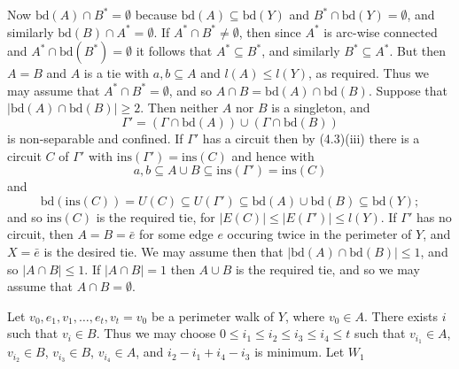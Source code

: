 Now $\text{bd}(A) \cap B^* = \emptyset$ because $\text{bd}(A) \subseteq \text{bd}(Y)$ and $B^* \cap \text{bd}(Y) = \emptyset$, and similarly $\text{bd}(B) \cap A^* = \emptyset$. If $A^* \cap B^* \ne \emptyset$, then since $A^*$ is arc-wise connected and $A^* \cap \text{bd}(B^*) = \emptyset$ it follows that $A^* \subseteq B^*$, and similarly $B^* \subseteq A^*$. But then $A = B$ and $A$ is a tie with $a, b \subseteq A$ and $l(A) \le l(Y)$, as required. Thus we may assume that $A^* \cap B^* = \emptyset$, and so $A \cap B = \text{bd}(A) \cap \text{bd}(B)$. Suppose that $|\text{bd}(A) \cap \text{bd}(B)| \ge 2$. Then neither $A$ nor $B$ is a singleton, and
\begin{equation*}
\Gamma' = (\Gamma \cap \text{bd}(A)) \cup (\Gamma \cap \text{bd}(B))
\end{equation*}
is non-separable and confined. If $\Gamma'$ has a circuit then by (4.3)(iii) there is a circuit $C$ of $\Gamma'$ with $\text{ins}(\Gamma') = \text{ins}(C)$ and hence with
\begin{equation*}
a, b \subseteq A \cup B \subseteq \text{ins}(\Gamma') = \text{ins}(C)
\end{equation*}
and
\begin{equation*}
\text{bd}(\text{ins}(C)) = U(C) \subseteq U(\Gamma') \subseteq \text{bd}(A) \cup \text{bd}(B) \subseteq \text{bd}(Y);
\end{equation*}
and so $\text{ins}(C)$ is the required tie, for $|E(C)| \le |E(\Gamma')| \le l(Y)$. If $\Gamma'$ has no circuit, then $A = B = \bar{e}$ for some edge $e$ occuring twice in the perimeter of $Y$, and $X = \bar{e}$ is the desired tie. We may assume then that $|\text{bd}(A) \cap \text{bd}(B)| \le 1$, and so $|A \cap B| \le 1$. If $|A \cap B| = 1$ then $A \cup B$ is the required tie, and so we may assume that $A \cap B = \emptyset$.

Let $v_0, e_1, v_1, \dots, e_t, v_t = v_0$ be a perimeter walk of $Y$, where $v_0 \in A$. There exists $i$ such that $v_i \in B$. Thus we may choose $0 \le i_1 \le i_2 \le i_3 \le i_4 \le t$ such that $v_{i_1} \in A$, $v_{i_2} \in B$, $v_{i_3} \in B$, $v_{i_4} \in A$, and $i_2 - i_1 + i_4 - i_3$ is minimum. Let $W_1$

